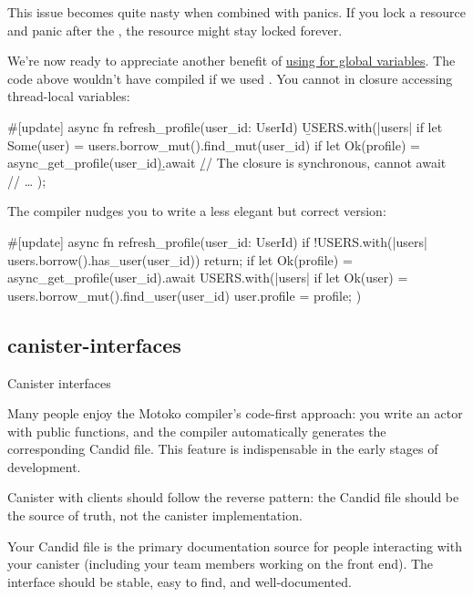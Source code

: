 \documentclass{article}
\begin{document}
This issue becomes quite nasty when combined with panics.
If you lock a resource and panic after the , the resource might stay locked forever.

We're now ready to appreciate another benefit of \href{#use-threadlocal}{using  for global variables}.
The code above wouldn't have compiled if we used .
You cannot  in closure accessing thread-local variables:

\begin{code}[bad]
#[update]
async fn refresh_profile(user_id: UserId) {
    \b{USERS.with}(|users| {
        if let Some(user) = users.borrow_mut().find_mut(user_id) {
            if let Ok(profile) = async_get_profile(user_id)\b{.await} {
                \b{// The closure is synchronous, cannot await ^^^}
                // \ldots
            }
        }
    });
}
\end{code}

The compiler nudges you to write a less elegant but correct version:

\begin{code}[good]
#[update]
async fn refresh_profile(user_id: UserId) {
    if !USERS.with(|users| users.borrow().has_user(user_id)) {
        return;
    }
    if let Ok(profile) = async_get_profile(user_id).await {
        USERS.with(|users| {
            if let Ok(user) = users.borrow_mut().find_user(user_id) {
                user.profile = profile;
            }
        })
    }
}
\end{code}

\subsection{canister-interfaces}{Canister interfaces}

Many people enjoy the Motoko compiler's code-first approach: you write an actor with public functions, and the compiler automatically generates the corresponding Candid file.
This feature is indispensable in the early stages of development.

Canister with clients should follow the reverse pattern: the Candid file should be the source of truth, not the canister implementation.


Your Candid file is the primary documentation source for people interacting with your canister (including your team members working on the front end).
The interface should be stable, easy to find, and well-documented.
\end{document}
